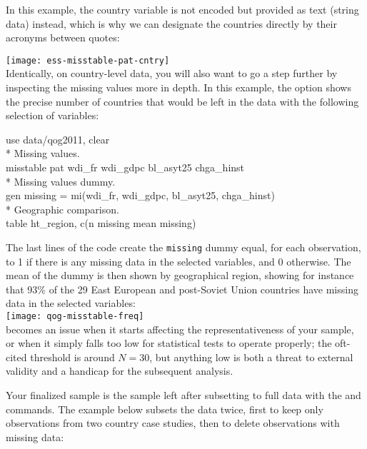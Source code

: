 	In this example, the country variable is not encoded but provided as text (string data) instead, which is why we can designate the countries directly by their acronyms between quotes:

	\texttt{[image: ess-misstable-pat-cntry]}\\[1em]
	
	Identically, on country-level data, you will also want to go a step further by inspecting the missing values more in depth. In this example, the  option shows the precise number of countries that would be left in the data with the following selection of variables:\\[1em]
	
	\begin{docspec}
		use data/qog2011, clear\\%
		* Missing values.\\%
		misstable pat wdi\_fr wdi\_gdpc bl\_asyt25 chga\_hinst\\[1em]%
		* Missing values dummy.\\%
		gen missing = mi(wdi\_fr, wdi\_gdpc, bl\_asyt25, chga\_hinst)\\%
		* Geographic comparison.\\%
		table ht\_region, c(n missing mean missing)
	\end{docspec}
	
	The last lines of the code create the \texttt{missing} dummy equal, for each observation, to 1 if there is any missing data in the selected variables, and 0 otherwise. The mean of the dummy is then shown by geographical region, showing for instance that 93\% of the 29 East European and post-Soviet Union countries have missing data in the selected variables:\\[1em]
	
	\texttt{[image: qog-misstable-freq]}\\[1em]
	
	 becomes an issue when it starts affecting the representativeness of your sample, or when it simply falls too low for statistical tests to operate properly; the oft-cited threshold is around $N = 30$, but anything low is both a threat to external validity and a handicap for the subsequent analysis. 
	
	Your finalized sample is the sample left after subsetting to full data with the  and  commands. The example below subsets the \ESS data twice, first to keep only observations from two country case studies, then to delete observations with missing data:
	
